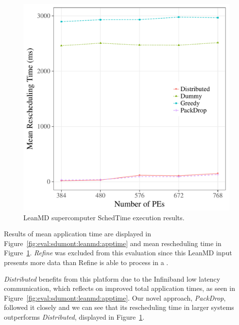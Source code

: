 
\begin{figure}
	\centering
	\includegraphics[width=0.9\linewidth]{images/schedtime_leanmd_sdumont.pdf}
	\caption{LeanMD supercomputer SchedTime execution results.}
	\label{fig:eval:sdumont:leanmd:schedtime}
\end{figure}

Results of mean application time are displayed in Figure~\ref{fig:eval:sdumont:leanmd:apptime} and mean rescheduling time in Figure~\ref{fig:eval:sdumont:leanmd:schedtime}.
\textit{Refine} was excluded from this evaluation since this LeanMD input presents more data than Refine is able to process in a . %

\textit{Distributed} benefits from this platform due to the Infiniband low latency communication, which reflects on improved total application times, as seen in Figure~\ref{fig:eval:sdumont:leanmd:apptime}.
Our novel approach, \textit{PackDrop}, followed it closely and we can see that its rescheduling time in larger systems outperforms \textit{Distributed}, displayed in Figure~\ref{fig:eval:sdumont:leanmd:schedtime}.

